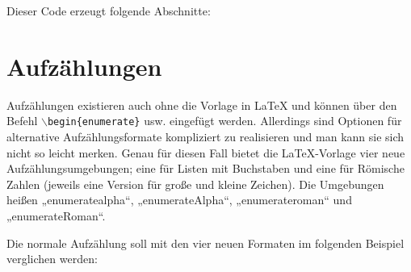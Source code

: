 			Dieser Code erzeugt folgende Abschnitte:

			\newline

		\section{Aufzählungen}

			Aufzählungen existieren auch ohne die Vorlage in \LaTeX{} und können \zb über den Befehl \texttt{$\backslash$begin\{enumerate\}} usw. eingefügt werden. Allerdings sind Optionen für alternative Aufzählungsformate kompliziert zu realisieren und man kann sie sich nicht so leicht merken. Genau für diesen Fall bietet die \LaTeX{}-Vorlage vier neue Aufzählungsumgebungen; eine für Listen mit Buchstaben und eine für Römische Zahlen (jeweils eine Version für große und kleine Zeichen). Die Umgebungen heißen „enumeratealpha“, „enumerateAlpha“, „enumerateroman“ und „enumerateRoman“.

			Die normale Aufzählung soll mit den vier neuen Formaten im folgenden Beispiel verglichen werden:

